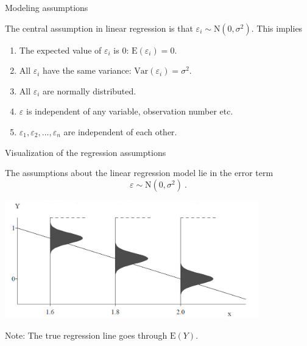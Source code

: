 \documentclass[10pt,ignorenonframetext,]{beamer}
\begin{document}
\begin{frame}

\begin{block}{Modeling assumptions}

\vspace{4mm} The central assumption in linear regression is that
\(\varepsilon_i \sim \text{N}(0,\sigma^2)\). This implies \vspace{2mm}

\begin{enumerate}
\def\labelenumi{\alph{enumi})}
\item
  The expected value of \(\varepsilon_i\) is 0:
  \(\text{E}(\varepsilon_i)=0\).
\item
  All \(\varepsilon_i\) have the same variance:
  \(\text{Var}(\varepsilon_i)=\sigma^2\).
\item
  All \(\varepsilon_i\) are normally distributed.
\item
  \(\varepsilon\) is independent of any variable, observation number
  etc.
\item
  \(\varepsilon_1, \varepsilon_2, \ldots, \varepsilon_n\) are
  independent of each other.
\end{enumerate}

\end{block}

\end{frame}

\begin{frame}

\begin{block}{Visualization of the regression assumptions}

The assumptions about the linear regression model lie in the error term
\[\varepsilon \sim \text{N}(0,\sigma^2) \ . \]

\vspace{-2mm} \includegraphics[width=11cm]{pictures/regrAssumptions.jpg}

Note: The true regression line goes through \(\text{E}(Y)\).

\end{block}

\end{frame}
\end{document}
